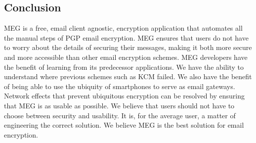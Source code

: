 \documentclass[10pt]{article}
\begin{document}
\begin{multicols}{2}
\section{Conclusion}
\par MEG is a free, email client agnostic, encryption application that automates all the manual steps of PGP email encryption. MEG ensures that users do not have to worry about the details of securing their messages, making it both more secure and more accessible than other email encryption schemes. MEG developers have the benefit of learning from its predecessor applications. We have the ability to understand where previous schemes such as KCM failed. We also have the benefit of being able to use the ubiquity of smartphones to serve as email gateways. Network effects that prevent ubiquitous encryption can be resolved by ensuring that MEG is as usable as possible. We believe that users should not have to choose between security and usability. It is, for the average user, a matter of engineering the correct solution. We believe MEG is the best solution for email encryption.



\end{multicols}
\end{document}
